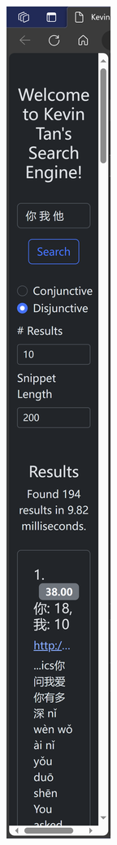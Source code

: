\documentclass[12pt]{article}
\begin{document}
\begin{figure}[!h]
\begin{subfigure}{0.123\textwidth}
    \includegraphics{readme.assets/image-20231112214917007.png}
    \caption{}
    \label{web}
  \end{subfigure}
  \begin{subfigure}{0.877\textwidth}

\end{subfigure}
\end{figure}
\end{document}
